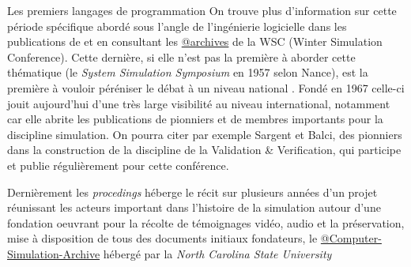 \begin{framewithtitle}{ Les premiers langages de programmation }
On trouve plus d'information sur cette période spécifique abordé sous l'angle de l'ingénierie logicielle dans les publications de \textcites{Nance2013,Nance1993, Araten1992, Nance2002} et en consultant les \href{http://informs-sim.org/}{@archives} de la WSC (Winter Simulation Conference). Cette dernière, si elle n'est pas la première à aborder cette thématique (le \textit{System Simulation Symposium} en 1957 selon Nance), est la première à vouloir péréniser le débat à un niveau national \autocite{Nance2002}. Fondé en 1967 \autocite{Crain1992, Araten1992} celle-ci jouit aujourd'hui d'une très large visibilité au niveau international, notamment car elle abrite les publications de pionniers et de membres importants pour la discipline simulation. On pourra citer par exemple Sargent et Balci, des pionniers dans la construction de la discipline de la Validation \& Verification, qui participe et publie régulièrement pour cette conférence. 

Dernièrement les \textit{procedings} héberge le récit sur plusieurs années d'un projet \autocite{Nance2013} réunissant les acteurs important dans l'histoire de la simulation autour d'une fondation oeuvrant pour la récolte de témoignages vidéo, audio et la préservation, mise à disposition de tous des documents initiaux fondateurs, le \href{http://d.lib.ncsu.edu/computer-simulation/}{@Computer-Simulation-Archive} hébergé par la \textit{North Carolina State University}

\end{framewithtitle}

